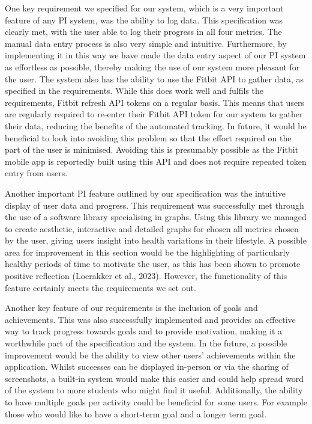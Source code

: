 \documentclass[11pt]{article}
\begin{document}
One key requirement we specified for our system, which is a very important 
feature of any PI system, was the ability to log data. This specification was 
clearly met, with the user able to log their progress in all four metrics. The 
manual data entry process is also very simple and intuitive. 
Furthermore, by implementing it in this way we have made the data entry 
aspect of our PI system as effortless as possible, thereby making the use of 
our system more pleasant for the user. The system also has the ability to use 
the Fitbit API to gather data, as specified in the requirements. While this 
does work well and fulfils the requirements, Fitbit refresh API tokens on a 
regular basis. This means that users are regularly required to re-enter their 
Fitbit API token for our system to gather their data, reducing the benefits of 
the automated tracking. In future, it would be beneficial to look into 
avoiding this problem so that the effort required on the part of the user is 
minimised. Avoiding this is presumably possible as the Fitbit mobile app is 
reportedly built using this API and does not require repeated token entry from 
users.\par

Another important PI feature outlined by our specification was the 
intuitive display of user data and progress. This requirement was successfully 
met through the use of a software library specialising in graphs. Using this library
we managed to create aesthetic, interactive and detailed graphs for chosen all metrics chosen 
by the user, giving users insight into health variations in their lifestyle. A possible 
area for improvement in this section would be the highlighting of particularly 
healthy periods of time to motivate the user, as this has been shown to promote 
positive reflection (Loerakker et al., 2023). However, the functionality of 
this feature certainly meets the requirements we set out.\par

Another key feature of our requirements is the inclusion of 
goals and achievements. This was also successfully implemented and provides 
an effective way to track progress towards goals and to provide motivation, 
making it a worthwhile part of the specification and the system. In the future, a possible
improvement would be the ability to view other users' 
achievements within the application. Whilst successes can be displayed in-person or via 
the sharing of screenshots, a built-in system 
would make this easier and could help spread word of the system to more 
students who might find it useful. Additionally, the ability to have multiple 
goals per activity could be beneficial for some users. For example those who 
would like to have a short-term goal and a longer term goal.\par
\end{document}
